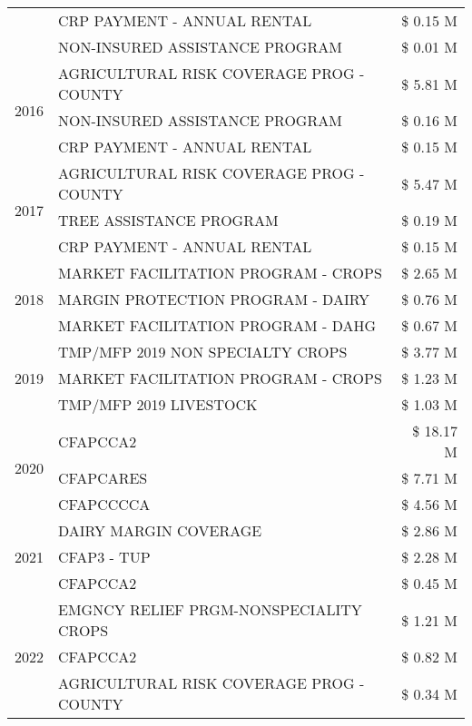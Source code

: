 \begin{tabular}{llr}
 & CRP PAYMENT - ANNUAL RENTAL & \$ 0.15 M \\
 & NON-INSURED ASSISTANCE PROGRAM & \$ 0.01 M \\
\cline{1-3}
\multirow[t]{3}{*}{2016} & AGRICULTURAL RISK COVERAGE PROG - COUNTY & \$ 5.81 M \\
 & NON-INSURED ASSISTANCE PROGRAM & \$ 0.16 M \\
 & CRP PAYMENT - ANNUAL RENTAL & \$ 0.15 M \\
\cline{1-3}
\multirow[t]{3}{*}{2017} & AGRICULTURAL RISK COVERAGE PROG - COUNTY & \$ 5.47 M \\
 & TREE ASSISTANCE PROGRAM & \$ 0.19 M \\
 & CRP PAYMENT - ANNUAL RENTAL & \$ 0.15 M \\
\cline{1-3}
\multirow[t]{3}{*}{2018} & MARKET FACILITATION PROGRAM - CROPS & \$ 2.65 M \\
 & MARGIN PROTECTION PROGRAM - DAIRY & \$ 0.76 M \\
 & MARKET FACILITATION PROGRAM - DAHG & \$ 0.67 M \\
\cline{1-3}
\multirow[t]{3}{*}{2019} & TMP/MFP 2019 NON SPECIALTY CROPS & \$ 3.77 M \\
 & MARKET FACILITATION PROGRAM - CROPS & \$ 1.23 M \\
 & TMP/MFP 2019 LIVESTOCK & \$ 1.03 M \\
\cline{1-3}
\multirow[t]{3}{*}{2020} & CFAPCCA2 & \$ 18.17 M \\
 & CFAPCARES & \$ 7.71 M \\
 & CFAPCCCCA & \$ 4.56 M \\
\cline{1-3}
\multirow[t]{3}{*}{2021} & DAIRY MARGIN COVERAGE & \$ 2.86 M \\
 & CFAP3 - TUP & \$ 2.28 M \\
 & CFAPCCA2 & \$ 0.45 M \\
\cline{1-3}
\multirow[t]{3}{*}{2022} & EMGNCY RELIEF PRGM-NONSPECIALITY CROPS & \$ 1.21 M \\
 & CFAPCCA2 & \$ 0.82 M \\
 & AGRICULTURAL RISK COVERAGE PROG - COUNTY & \$ 0.34 M \\
\cline{1-3}
\bottomrule
\end{tabular}
